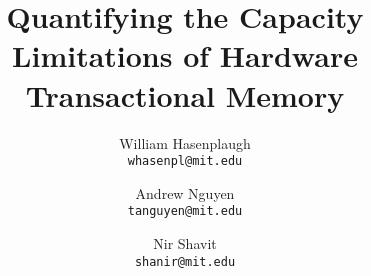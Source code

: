 \documentclass{article}
\author{
  William Hasenplaugh\\
  \texttt{whasenpl@mit.edu}
  \and
  Andrew Nguyen\\
  \texttt{tanguyen@mit.edu}
  \and
  Nir Shavit\\
  \texttt{shanir@mit.edu}
}
\title{Quantifying the Capacity Limitations of Hardware Transactional Memory}
\date{}
\begin{document}
\maketitle







\small
\end{document}
